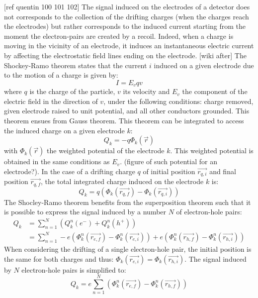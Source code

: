 [ref quentin 100 101 102]
The signal induced on the electrodes of a detector does not corresponds to the collection of the drifting charges (when the charges reach the electrodes) but rather corresponds to the induced current starting from the moment the electron-pairs are created by a recoil. Indeed, when a charge is moving in the vicinity of an electrode, it induces an instantaneous electric current by affecting the electrostatic field lines ending on the electrode. 
[wiki after]
The Shockey-Ramo theorem states that the current $i$ induced on a given electrode due to the motion of a charge is given by:
\begin{equation}
I = E_v q v
\end{equation}
where $q$ is the charge of the particle, $v$ its velocity and $E_v$ the component of the electric field in the direction of $v$, under the following conditions: charge removed, given electrode raised to unit potential, and all other conductors grounded. This theorem ensues from Gauss theorem.
This theorem can be integrated to access the induced charge on a given electrode $k$:
\begin{equation}
\label{eq:ramo-theorem-integrated}
Q_k = - q \Phi_k(\vec{r})
\end{equation}
with $\Phi_k(\vec{r})$ the weighted potential of the electrode $k$. This weighted potential is obtained in the same conditions as $E_v$. (figure of such potential for an electrode?).
In the case of a drifting charge $q$ of initial position $\vec{r_{q,i}}$ and final position $\vec{r_{q,f}}$, the total integrated charge induced on the electrode $k$ is:
\begin{equation}
Q_k = q \left( \Phi_k (\vec{r_{q,f}}) - \Phi_k (\vec{r_{q,i}}) \right)
\end{equation}
The Shocley-Ramo theorem benefits from the superposition theorem such that it is possible to express the signal induced by a number $N$ of electron-hole pairs:
\begin{align}
Q_k &= \sum_{n=1}^{N} \left( Q_k^n(e^-) + Q_k^n(h^+) \right) \\
&= \sum_{n=1}^{N} -e \left( \Phi_k^n (\vec{r_{e,f}}) - \Phi_k^n (\vec{r_{e,i}}) \right) +e \left( \Phi_k^n (\vec{r_{h,f}}) - \Phi_k^n (\vec{r_{h,i}}) \right)
\end{align}
When considering the drifting of a single electron-hole pair, the initial position is the same for both charges and thus: $\Phi_k (\vec{r_{e,i}}) = \Phi_k (\vec{r_{h,i}})$.
The signal induced by $N$ electron-hole pairs is simplified to:
\begin{equation}
Q_k = e \sum_{n=1}^{N} \left( \Phi_k^n (\vec{r_{e,f}}) - \Phi_k^n (\vec{r_{h,f}}) \right)
\end{equation}
